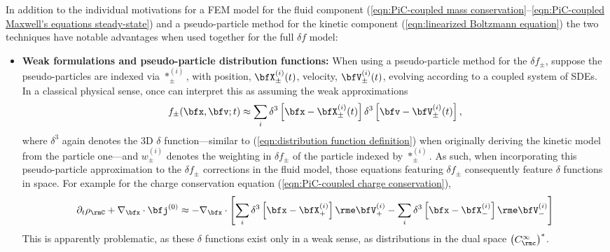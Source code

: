     In addition to the individual motivations for a FEM model for the fluid component (\ref{eqn:PiC-coupled mass conservation}--\ref{eqn:PiC-coupled Maxwell's equations steady-state}) and a pseudo-particle method for the kinetic component (\ref{eqn:linearized Boltzmann equation}) the two techniques have notable advantages when used together for the full $\delta\!f$ model:
    \begin{itemize}
        \item  {\bf Weak formulations and pseudo-particle distribution functions:} When using a pseudo-particle method for the $\delta\!f_{\pm}$, suppose the pseudo-particles are indexed via $*_{\pm}^{(i)}$, with position, $\bfX_{\pm}^{(i)}(t)$, velocity, $\bfV_{\pm}^{(i)}(t)$, evolving according to a coupled system of SDEs. In a classical physical sense, once can interpret this as assuming the weak approximations
        \begin{equation}
            f_{\pm}(\bfx, \bfv; t)  \approx  \sum_{i}\delta^{3}\left[\bfx - \bfX_{\pm}^{(i)}(t)\right]\delta^{3}\left[\bfv - \bfV_{\pm}^{(i)}(t)\right],
        \end{equation}
        where $\delta^{3}$ again denotes the 3D $\delta$ function---similar to (\ref{eqn:distribution function definition}) when originally deriving the kinetic model from the particle one---and $w_{\pm}^{(i)}$ denotes the weighting in $\delta\!f_{\pm}$ of the particle indexed by $*_{\pm}^{(i)}$. As such, when incorporating this pseudo-particle approximation to the $\delta\!f_{\pm}$ corrections in the fluid model, those equations featuring $\delta\!f_{\pm}$ consequently feature $\delta$ functions in space. For example for the charge conservation equation (\ref{eqn:PiC-coupled charge conservation}),
        \begin{equation}\label{eqn:PiC-coupled charge conservation with pseudo-particles}
            \partial_{t}\rho_{\rmC} + \nabla_{\bfx}\cdot\bfj^{(0)}  \approx  - \nabla_{\bfx}\cdot\left[\sum_{i}\delta^{3}\left[\bfx - \bfX_{+}^{(i)}\right]\rme\bfV_{+}^{(i)} - \sum_{i}\delta^{3}\left[\bfx - \bfX_{-}^{(i)}\right]\rme\bfV_{-}^{(i)}\right]
        \end{equation}        
        This is apparently problematic, as these $\delta$ functions exist only in a weak sense, as distributions in the dual space $\left(C^{\infty}_{\rmc}\right)^{*}$.
        

\end{itemize}
